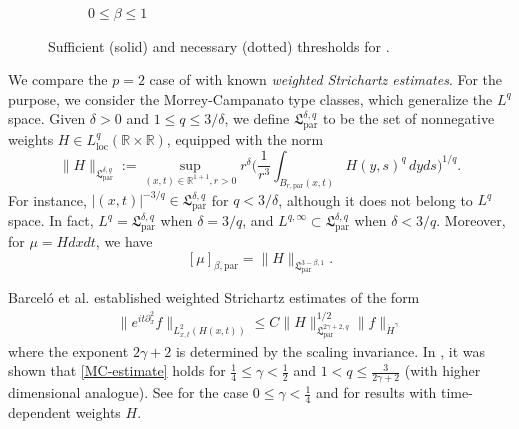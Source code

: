 \documentclass[11pt]{amsart}
\theoremstyle{definition}
\theoremstyle{remark}
\newcommand{\R}{\mathbb{R}}
\begin{document}
\begin{figure}[!htbp]
\begin{subfigure}[b][2cm][c]{0.46\textwidth}
\vspace{-0.2cm}
\caption{$0\le \beta \le 1$}
\end{subfigure}

\vspace{6mm}
\caption{Sufficient (solid) and necessary (dotted) thresholds for .}
\label{fig:par_two_panels}
\end{figure}

We compare the $p=2$ case of  with known \textit{weighted Strichartz estimates}. For the purpose, we consider the Morrey-Campanato type classes, which generalize the $L^q$ space. Given $\delta>0$ and $1\le q \le 3/\delta$, we define $\mathfrak L_{\text{par}}^{\delta,q}$ to be the set of nonnegative weights $H\in L_{\text{loc}}^q(\R\times\R)$, equipped with the norm
\[
\|H\|_{\mathfrak L_{\text{par}}^{\delta,q}}
:=
\sup_{(x,t)\in \R^{1+1}, r>0}
r^\delta \Big( \frac{1}{r^{3}}
\int_{B_{r, \text{par}}(x,t)} H(y,s)^q\,dyds\Big)^{1/q}.
\]
For instance, $|(x,t)|^{-3/q} \in \mathfrak L_{\text{par}}^{\delta,q}$ for $q<3/\delta$, although it does not belong to $L^q$ space. In fact, 
$L^q=\mathfrak L_{\text{par}}^{\delta,q}$ when $\delta=3/q$, and $L^{q,\infty}\subset \mathfrak L_{\text{par}}^{\delta,q}$ when $\delta<3/q$. Moreover, for $\mu=Hdxdt$, we have
\[[\mu]_{\beta,\text{par}}= \|H\|_{\mathfrak L_{\text{par}}^{3-\beta,1}}.\] 


Barcel\'o et al. \cite{BBCRV} established weighted Strichartz estimates of the form
\begin{align}\label{MC-estimate}
\| e^{it\partial_x^2}f\|_{L_{x,t}^2(H(x,t))} \le C \|H\|_{\mathfrak L_{\text{par}}^{2\gamma+2,q}}^{1/2}\|f\|_{\dot{H}^\gamma}
\end{align}
where the exponent $2\gamma+2$ is determined by the scaling invariance. In \cite{BBCRV}, it was shown that \eqref{MC-estimate} holds for $\frac14 \le \gamma< \frac12$ and $1<q\le \frac{3}{2\gamma+2}$ (with higher dimensional analogue). 
See \cite{BBCRV, KS} for the case $0\le \gamma <\frac14$ and \cite{BBCRV2} for results with time-dependent weights $H$.
\end{document}
